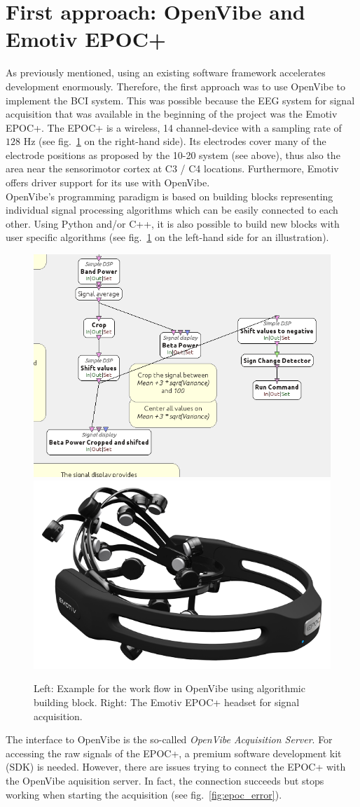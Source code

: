 \documentclass[a4paper,twoside, openright,12pt]{report}
\begin{document}
\section{First approach: OpenVibe and Emotiv EPOC+}
As previously mentioned, using an existing software framework accelerates development enormously. Therefore, the first approach was to use OpenVibe to implement the BCI system. This was possible because the EEG system for signal acquisition that was available in the beginning of the project was the Emotiv EPOC+. The EPOC+ is a wireless, 14 channel-device with a sampling rate of $128$ Hz (see fig.~\ref*{fig:openvibe_blocks} on the right-hand side). Its electrodes cover many of the electrode positions as proposed by the 10-20 system (see above), thus also the area near the sensorimotor cortex at C3 / C4 locations. Furthermore, Emotiv offers driver support for its use with OpenVibe.\\
OpenVibe's programming paradigm is based on building blocks representing individual signal processing algorithms which can be easily connected to each other. Using Python and/or C++, it is also possible to build new blocks with user specific algorithms (see fig.~\ref{fig:openvibe_blocks} on the left-hand side for an illustration).
\begin{figure}[tbph!]
\centering
\includegraphics[width=0.6\linewidth]{gfx/openvibe_blocks}
\includegraphics[width=0.39\linewidth]{gfx/emotiv_epoc}
\caption{Left: Example for the work flow in OpenVibe using algorithmic building block. Right: The Emotiv EPOC+ headset for signal acquisition.}
\label{fig:openvibe_blocks}
\end{figure}
The interface to OpenVibe is the so-called \textit{OpenVibe Acquisition Server}. For accessing the raw signals of the EPOC+, a premium software development kit (SDK) is needed. However, there are issues trying to connect the EPOC+ with the OpenVibe aquisition server. In fact, the connection succeeds but stops working when starting the acquisition (see fig.~\ref{fig:epoc_error}).
 
\end{document}
